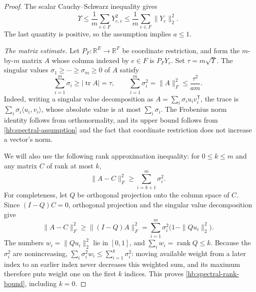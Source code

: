 \documentclass[11pt]{amsart}
\newcommand{\R}{\mathbb R}
\DeclareMathOperator{\tr}{tr}
\DeclareMathOperator{\rank}{rank}
\theoremstyle{definition}
\theoremstyle{remark}
\numberwithin{equation}{section}
\begin{document}
\begin{proof}
The scalar Cauchy--Schwarz inequality gives
\[
 \Upsilon\le\frac1m\sum_{e\in F}Y_{e,e}^2
 \le\frac1m\sum_{e\in F}\|Y_e\|_2^2.
\]
The last quantity is positive, so the assumption implies \(a\le1\).

\smallskip
\noindent\emph{The matrix estimate.}
Let \(P_F:\R^E\to\R^F\) be coordinate restriction, and form the
\(m\)-by-\(m\) matrix \(A\) whose column indexed by \(e\in F\)
is \(P_FY_e\).  Set \(\tau=m\sqrt\Upsilon\).
The singular values \(\sigma_1\ge\cdots\ge\sigma_m\ge0\) of \(A\)
satisfy
\begin{equation}\label{hb:spectral-matrix-bounds}
 \sum_{i=1}^m\sigma_i\ge|\tr A|=\tau,
 \qquad
 \sum_{i=1}^m\sigma_i^2=\|A\|_F^2
 \le\frac{\tau^2}{am}.
\end{equation}
Indeed, writing a singular value decomposition as
\(A=\sum_i\sigma_i u_i v_i^{\mathsf T}\), the trace is
\(\sum_i\sigma_i\langle u_i,v_i\rangle\), whose absolute value
is at most \(\sum_i\sigma_i\).  The Frobenius norm identity follows
from orthonormality, and its upper bound follows from
\eqref{hb:spectral-assumption} and the fact that coordinate restriction
does not increase a vector's norm.

We will also use the following rank approximation inequality:
for \(0\le k\le m\) and any matrix \(C\) of rank at most \(k\),
\begin{equation}\label{hb:spectral-rank-bound}
 \|A-C\|_F^2\ge\sum_{i=k+1}^m\sigma_i^2.
\end{equation}
For completeness, let \(Q\) be orthogonal projection onto the column
space of \(C\).  Since \((I-Q)C=0\), orthogonal projection and the
singular value decomposition give
\[
 \|A-C\|_F^2
 \ge\|(I-Q)A\|_F^2
 =\sum_{i=1}^m\sigma_i^2\bigl(1-\|Qu_i\|_2^2\bigr).
\]
The numbers \(w_i=\|Qu_i\|_2^2\) lie in \([0,1]\), and
\(\sum_iw_i=\rank Q\le k\).
Because the \(\sigma_i^2\) are nonincreasing,
\(\sum_i\sigma_i^2w_i\le\sum_{i=1}^k\sigma_i^2\):
moving available weight from a later index to an earlier index never
decreases this weighted sum, and its maximum therefore puts weight one
on the first \(k\) indices.  This proves
\eqref{hb:spectral-rank-bound}, including \(k=0\).


\end{proof}
\end{document}
